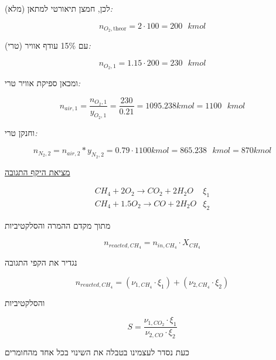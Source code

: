 \documentclass[
  hebrew,
  letterpaper,
  DIV=11,
  numbers=noendperiod]{scrreprt}
\begin{document}
לכן, חמצן תיאורטי למתאן (מלא)\emph{:}

\[n_{O_{2},\text{theor}} = 2 \cdot 100 = 200\text{ }kmol\]

עם 15\% עודף אוויר (טרי)\emph{:}

\[n_{O_{2},1} = 1.15 \cdot 200 = 230\text{ }kmol\]

ומכאן ספיקת אוויר טרי\emph{:}

\[n_{air,1} = \frac{n_{O_{2},1}}{y_{O_{2},1}} = \frac{230}{0.21} = 1095.238kmol = 1100\text{ }kmol\]

וחנקן טרי\emph{:}

\[n_{N_{2},2} = n_{air,2}*y_{N_{2},2} = 0.79 \cdot 1100kmol = 865.238\text{ }kmol = 870kmol\]

\ul{מציאת היקף התגובה}

\[\begin{matrix}
CH_{4} + 2O_{2} \rightarrow CO_{2} + 2H_{2}O & \xi_{1} \\
CH_{4} + 1.5O_{2} \rightarrow CO + 2H_{2}O & \xi_{2}
\end{matrix}\]

מתוך מקדם ההמרה והסלקטיביות

\[n_{reacted,CH_{4}} = n_{in,CH_{4}} \cdot X_{CH_{4}}\]

נגדיר את הקפי התגובה

\[n_{reacted,CH_{4}} = \left( \nu_{1,CH_{4}} \cdot \xi_{1} \right) + \left( \nu_{2,CH_{4}} \cdot \xi_{2} \right)\]

והסלקטיביות

\[S = \frac{\nu_{1,CO_{2}} \cdot \xi_{1}}{\nu_{2,CO} \cdot \xi_{2}}\]

כעת נסדר לעצמינו בטבלה את השינוי בכל אחד מהחומרים
\end{document}
